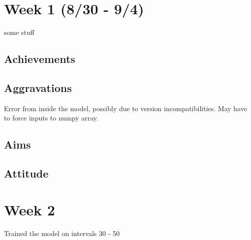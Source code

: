\documentclass[
]{book}
\begin{document}
\hypertarget{week-1-830---94}{%
\section{Week 1 (8/30 - 9/4)}\label{week-1-830---94}}

some stuff

\hypertarget{achievements}{%
\subsection{Achievements}\label{achievements}}

\hypertarget{aggravations}{%
\subsection{Aggravations}\label{aggravations}}

Error from inside the model, possibly due to version incompatibilities. May have to force inputs to numpy array.

\hypertarget{aims}{%
\subsection{Aims}\label{aims}}

\hypertarget{attitude}{%
\subsection{Attitude}\label{attitude}}

\hypertarget{week-2}{%
\section{Week 2}\label{week-2}}

Trained the model on intervals 30 - 50
\end{document}
